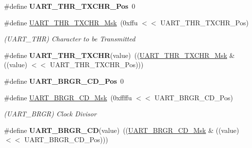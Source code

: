 \begin{DoxyCompactItemize}
\#define {\bfseries U\+A\+R\+T\+\_\+\+T\+H\+R\+\_\+\+T\+X\+C\+H\+R\+\_\+\+Pos}~0
\item 
\mbox{\label{group__SAMS70__UART_ga81879da01aac4e5cf429e9707ab48983}} 
\#define \mbox{\hyperlink{group__SAMS70__UART_ga81879da01aac4e5cf429e9707ab48983}{U\+A\+R\+T\+\_\+\+T\+H\+R\+\_\+\+T\+X\+C\+H\+R\+\_\+\+Msk}}~(0xffu $<$$<$ U\+A\+R\+T\+\_\+\+T\+H\+R\+\_\+\+T\+X\+C\+H\+R\+\_\+\+Pos)
\begin{DoxyCompactList}\small\item\em (U\+A\+R\+T\+\_\+\+T\+HR) Character to be Transmitted \end{DoxyCompactList}\item 
\mbox{\label{group__SAMS70__UART_ga2234b30af6b81e5870b59df7c2de935d}} 
\#define {\bfseries U\+A\+R\+T\+\_\+\+T\+H\+R\+\_\+\+T\+X\+C\+HR}(value)~((\mbox{\hyperlink{group__SAMV71__UART_ga81879da01aac4e5cf429e9707ab48983}{U\+A\+R\+T\+\_\+\+T\+H\+R\+\_\+\+T\+X\+C\+H\+R\+\_\+\+Msk}} \& ((value) $<$$<$ U\+A\+R\+T\+\_\+\+T\+H\+R\+\_\+\+T\+X\+C\+H\+R\+\_\+\+Pos)))
\item 
\mbox{\label{group__SAMS70__UART_gabe3a466943beb76f450710c221602c20}} 
\#define {\bfseries U\+A\+R\+T\+\_\+\+B\+R\+G\+R\+\_\+\+C\+D\+\_\+\+Pos}~0
\item 
\mbox{\label{group__SAMS70__UART_ga73b3dd57455736468a4feb1ac356ccf5}} 
\#define \mbox{\hyperlink{group__SAMS70__UART_ga73b3dd57455736468a4feb1ac356ccf5}{U\+A\+R\+T\+\_\+\+B\+R\+G\+R\+\_\+\+C\+D\+\_\+\+Msk}}~(0xffffu $<$$<$ U\+A\+R\+T\+\_\+\+B\+R\+G\+R\+\_\+\+C\+D\+\_\+\+Pos)
\begin{DoxyCompactList}\small\item\em (U\+A\+R\+T\+\_\+\+B\+R\+GR) Clock Divisor \end{DoxyCompactList}\item 
\mbox{\label{group__SAMS70__UART_gac9dea7b4cd4fbe4efc6c09f21aff1b9d}} 
\#define {\bfseries U\+A\+R\+T\+\_\+\+B\+R\+G\+R\+\_\+\+CD}(value)~((\mbox{\hyperlink{group__SAMV71__UART_ga73b3dd57455736468a4feb1ac356ccf5}{U\+A\+R\+T\+\_\+\+B\+R\+G\+R\+\_\+\+C\+D\+\_\+\+Msk}} \& ((value) $<$$<$ U\+A\+R\+T\+\_\+\+B\+R\+G\+R\+\_\+\+C\+D\+\_\+\+Pos)))
\item 
\mbox{\label{group__SAMS70__UART_ga2059ccc27426201efaaf6a053939bdab}} 

\end{DoxyCompactItemize}
